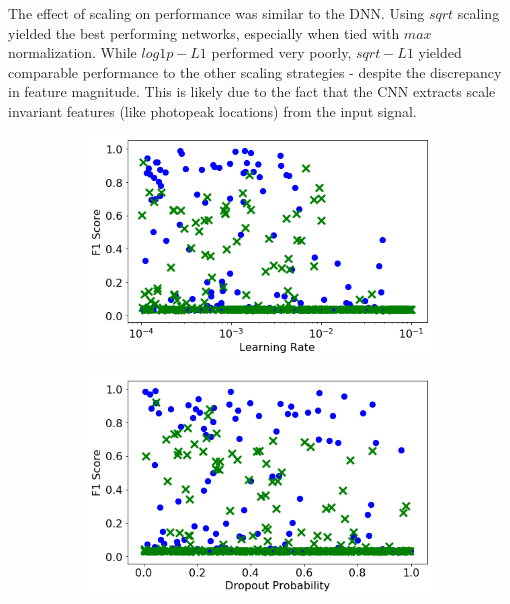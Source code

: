 The effect of scaling on performance was similar to the DNN. Using $sqrt$ scaling yielded the best performing networks, especially when tied with $max$ normalization. While $log1p-L1$ performed very poorly, $sqrt-L1$ yielded comparable performance to the other scaling strategies - despite the discrepancy in feature magnitude. This is likely due to the fact that the CNN extracts scale invariant features (like photopeak locations) from the input signal.


\begin{figure}[H]
     \centering
     \begin{subfigure}[b]{0.49\textwidth}
         \centering
         \includegraphics[width=\textwidth]{images/cnn_learning_rate.png}
         \caption{}
         \label{fig:cnn_learning_rate}
     \end{subfigure}
     \hfill
     \begin{subfigure}[b]{0.49\textwidth}
         \centering
         \includegraphics[width=\textwidth]{images/cnn_dropout.png}
         \caption{}
         \label{fig:cnn_dropout}
     \end{subfigure}


\end{figure}
